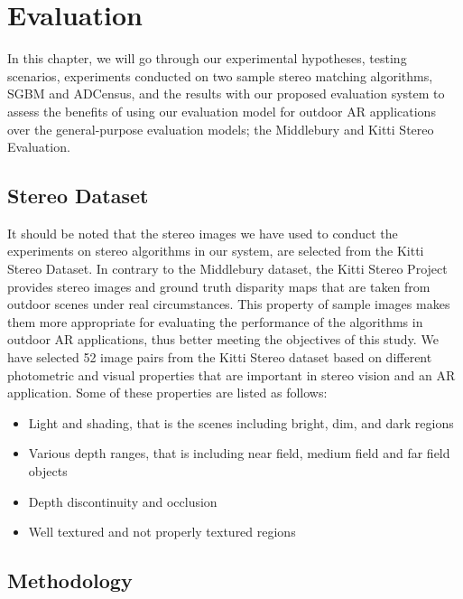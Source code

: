 \chapter{Evaluation}
\label{chap:Evaluation}
\renewcommand{\arraystretch}{0.5}

In this chapter, we will go through our experimental hypotheses, testing scenarios, experiments conducted on two sample 
stereo matching algorithms, SGBM and ADCensus, and the results with our
proposed evaluation system to assess the benefits of using our evaluation model for outdoor AR applications over the general-purpose evaluation models; 
the Middlebury and Kitti Stereo Evaluation.

\section{Stereo Dataset}
It should be noted that the stereo images we have used to conduct the experiments on stereo algorithms in our system,
are selected from the Kitti Stereo Dataset.
In contrary to the Middlebury dataset, the Kitti Stereo Project provides stereo images and ground truth disparity maps
that are taken from outdoor scenes under real circumstances. This property of sample images makes them more appropriate 
for evaluating the performance of the algorithms in outdoor AR applications, thus better meeting the objectives of this study.
We have selected 52 image pairs from the Kitti Stereo dataset based on different photometric and visual properties that are important
in stereo vision and an AR application. Some 
of these properties are listed as follows:
\begin{itemize}
\item Light and shading, that is the scenes including bright, dim, and dark regions
\item Various depth ranges, that is including near field, medium field and far field objects  
\item Depth discontinuity and occlusion
\item Well textured and not properly textured regions
\end{itemize}


\section{Methodology}

